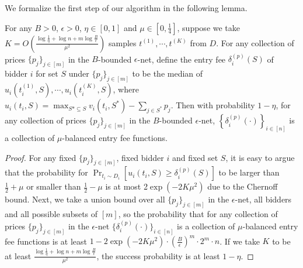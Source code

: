  We formalize the first step of our algorithm in the following lemma.
\begin{lemma}\label{lem:learn median}
For any $B>0$, $\epsilon>0$, $\eta\in [0,1]$ and $\mu\in[0,\frac{1}{4}]$, suppose we take %
$K=O\left(\frac{\log \frac{1}{\eta}+ \log n +m\log \frac{B}{\epsilon}}{\mu^2}\right)$ samples $t^{(1)},\cdots, t^{(K)}$ from $D$. For any collection of prices $\{p_j\}_{j\in[m]}$ in the $B$-bounded $\epsilon$-net, define the entry fee $\delta_i^{(p)}(S)$
 of bidder $i$ for set $S$ under $\{p_j\}_{j\in[m]}$ to be the median of $u_i(t^{(1)}_i,S),\cdots, u_i(t^{(K)}_i,S)$, where $u_i(t_i,S)=\max_{S*\subseteq S} v_i(t_i,S^*)-\sum_{j\in S^*} p_j$. Then with probability $1-\eta$, for any collection of prices $\{p_j\}_{j\in[m]}$ in the $B$-bounded $\epsilon$-net, $\left\{\delta_i^{(p)}(\cdot)\right\}_{i\in[n]}$ is a collection of $\mu$-balanced entry fee functions.\end{lemma}
 \begin{proof}
 	For any fixed $\{p_j\}_{j\in[m]}$, fixed bidder $i$ and fixed set $S$, it is easy to argue that the probability for $\Pr_{t_i\sim D_i}[u_i(t_i,S)\geq \delta_i^{(p)}(S)]$ to be larger than  $\frac{1}{2}+\mu$ or smaller than $\frac{1}{2}-\mu$ is at most 2$\exp(-2K\mu^2)$ due to the Chernoff bound. %
 	Next, we take a union bound over all $\{p_j\}_{j\in[m]}$ in the $\epsilon$-net, all bidders and all possible subsets of $[m]$, so the probability that for any collection of prices $\{p_j\}_{j\in[m]}$ in the $\epsilon$-net $\{\delta_i^{(p)}(\cdot)\}_{i\in[n]}$ is a collection of $\mu$-balanced entry fee functions is at least $1- 2\exp(-2K\mu^2)\cdot \left(\frac{B}{\epsilon}\right)^m\cdot 2^m\cdot n$. If we take $K$ to be at least $\frac{\log \frac{1}{\eta}+ \log n +m\log \frac{B}{\epsilon}}{\mu^2}$, the success probability is at least $1-\eta$.
 \end{proof}

